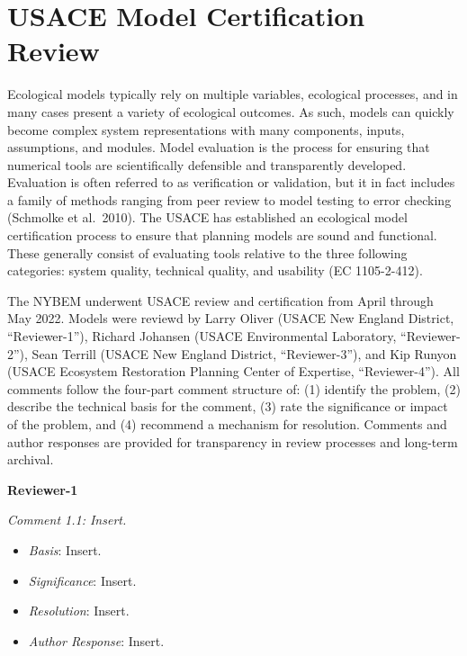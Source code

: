 \documentclass[
]{book}
\providecommand{\tightlist}{%
  \setlength{\itemsep}{0pt}\setlength{\parskip}{0pt}}
\begin{document}
\hypertarget{usace-model-certification-review}{%
\chapter{USACE Model Certification Review}\label{usace-model-certification-review}}

Ecological models typically rely on multiple variables, ecological processes, and in many cases present a variety of ecological outcomes. As such, models can quickly become complex system representations with many components, inputs, assumptions, and modules. Model evaluation is the process for ensuring that numerical tools are scientifically defensible and transparently developed. Evaluation is often referred to as verification or validation, but it in fact includes a family of methods ranging from peer review to model testing to error checking (Schmolke et al.~2010). The USACE has established an ecological model certification process to ensure that planning models are sound and functional. These generally consist of evaluating tools relative to the three following categories: system quality, technical quality, and usability (EC 1105-2-412).

The NYBEM underwent USACE review and certification from April through May 2022. Models were reviewd by Larry Oliver (USACE New England District, ``Reviewer-1''), Richard Johansen (USACE Environmental Laboratory, ``Reviewer-2''), Sean Terrill (USACE New England District, ``Reviewer-3''), and Kip Runyon (USACE Ecosystem Restoration Planning Center of Expertise, ``Reviewer-4''). All comments follow the four-part comment structure of: (1) identify the problem, (2) describe the technical basis for the comment, (3) rate the significance or impact of the problem, and (4) recommend a mechanism for resolution. Comments and author responses are provided for transparency in review processes and long-term archival.

\textbf{Reviewer-1}

\emph{Comment 1.1: Insert.}

\begin{itemize}
\tightlist
\item
  \emph{Basis}: Insert.\\
\item
  \emph{Significance}: Insert.\\
\item
  \emph{Resolution}: Insert.\\
\item
  \emph{Author Response}: Insert.
\end{itemize}
\end{document}

